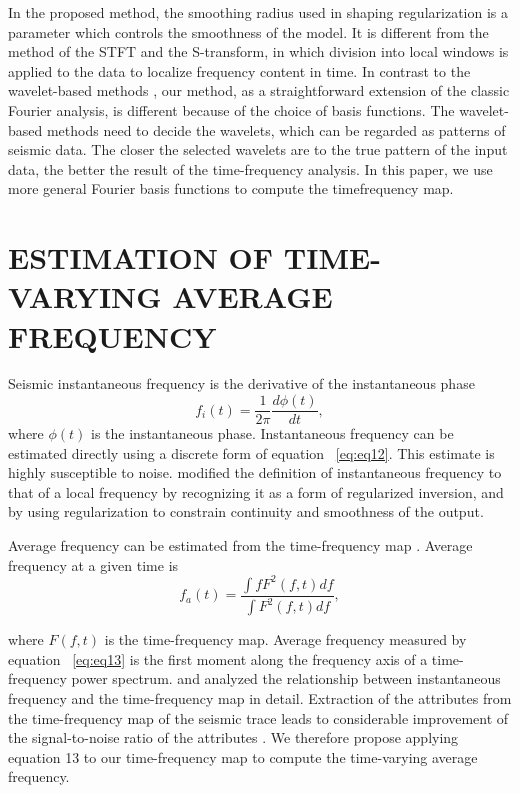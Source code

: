
In the proposed method, the smoothing radius used in shaping
regularization is a parameter which controls the smoothness of
the model. It is different from the method of the STFT and the
S-transform, in which division into local windows is applied to
the data to localize frequency content in time. In contrast to the
wavelet-based methods \cite[]{Chakraborty1995, Sinha2005, Wang2007}, our method, as a straightforward extension
of the classic Fourier analysis, is different because of the choice
of basis functions. The wavelet-based methods need to decide the
wavelets, which can be regarded as patterns of seismic data. The
closer the selected wavelets are to the true pattern of the input data,
the better the result of the time-frequency analysis. In this paper, we
use more general Fourier basis functions to compute the timefrequency
map.

\section{ESTIMATION OF TIME-VARYING AVERAGE FREQUENCY}

Seismic instantaneous frequency is the derivative of the instantaneous
phase
      \begin{equation}
          f_{i}(t)=\frac{1}{2\pi}\frac{d\phi (t)}{dt},
        \label{eq:eq12}
      \end{equation}
where $\phi (t)$ is the instantaneous phase. Instantaneous frequency can
be estimated directly using a discrete form of equation ~\ref{eq:eq12}. This
estimate is highly susceptible to noise. \cite{Fomel2007a} modified
the definition of instantaneous frequency to that of a local frequency
by recognizing it as a form of regularized inversion, and by using
regularization to constrain continuity and smoothness of the output.

Average frequency can be estimated from the time-frequency
map \cite[]{Claasen1980,Cohen1989, Hlawatsch1992, Steeghs2001, Sinha2009}. 
Average frequency at a given time is
      \begin{equation}
          f_{a}(t)=\frac{\int fF^{2}(f,t)df}{\int F^{2}(f,t)df},
        \label{eq:eq13}
      \end{equation}

where $F(f,t)$ is the time-frequency map. Average frequency measured
by equation ~\ref{eq:eq13} is the first moment along the frequency axis of
a time-frequency power spectrum. \cite{Saha1987} and \cite{Brian1993}
analyzed the relationship between instantaneous frequency
and the time-frequency map in detail. Extraction of the attributes
from the time-frequency map of the seismic trace leads to considerable
improvement of the signal-to-noise ratio of the attributes
\cite[]{Steeghs2001}. We therefore propose applying
equation 13 to our time-frequency map to compute the time-varying
average frequency.

